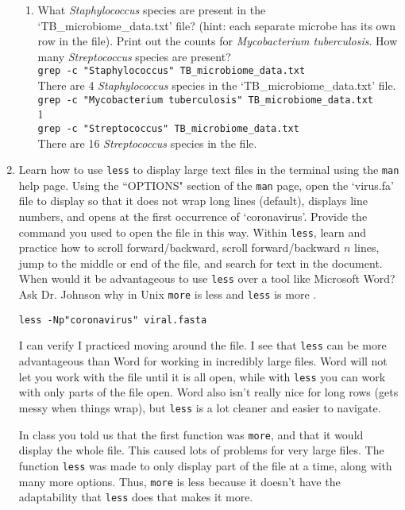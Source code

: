 \documentclass[11pt]{article}
\begin{document}
\begin{enumerate}
\begin{enumerate}
		\item What {\it Staphylococcus} species are present in the `TB\_microbiome\_data.txt' file? (hint: each separate microbe has its own row in the file). Print out the counts for {\it Mycobacterium tuberculosis}. How many {\it Streptococcus} species are present? \\
		\texttt{grep -c "Staphylococcus" TB\_microbiome\_data.txt} \\
		There are 4 {\it Staphylococcus} species in the `TB\_microbiome\_data.txt' file. \\
		\texttt{grep -c "Mycobacterium tuberculosis" TB\_microbiome\_data.txt}\\
		1\\
		\texttt{grep -c "Streptococcus" TB\_microbiome\_data.txt}\\
		There are 16 {\it Streptococcus} species in the file. 
		
		\end{enumerate}
		
	\newpage	
	\item Learn how to use \texttt{less} to display large text files in the terminal using the \texttt{man} help page. Using the ``OPTIONS" section of the \texttt{man} page, open the `virus.fa' file to display so that it does not wrap long lines (default), displays line numbers, and opens at the first occurrence of `coronavirus'. Provide the command you used to open the file in this way. Within \texttt{less}, learn and practice how to scroll forward/backward, scroll forward/backward $n$ lines, jump to the middle or end of the file, and search for text in the document. When would it be advantageous to use \texttt{less} over a tool like Microsoft Word? Ask Dr. Johnson why in Unix \texttt{more} is less and \texttt{less} is more \smiley{}.
	
	\texttt{less -Np"coronavirus" viral.fasta}
	
	I can verify I practiced moving around the file. I see that \texttt{less} can be more advantageous than Word for working in incredibly large files. Word will not let you work with the file until it is all open, while with \texttt{less} you can work with only parts of the file open. Word also isn't really nice for long rows (gets messy when things wrap), but \texttt{less} is a lot cleaner and easier to navigate.  
	
	In class you told us that the first function was \texttt{more}, and that it would display the whole file. This caused lots of problems for very large files. The function \texttt{less} was made to only display part of the file at a time, along with many more options. Thus, \texttt{more} is less because it doesn't have the adaptability that \texttt{less} does that makes it more.  
	

\end{enumerate}
\end{document}
